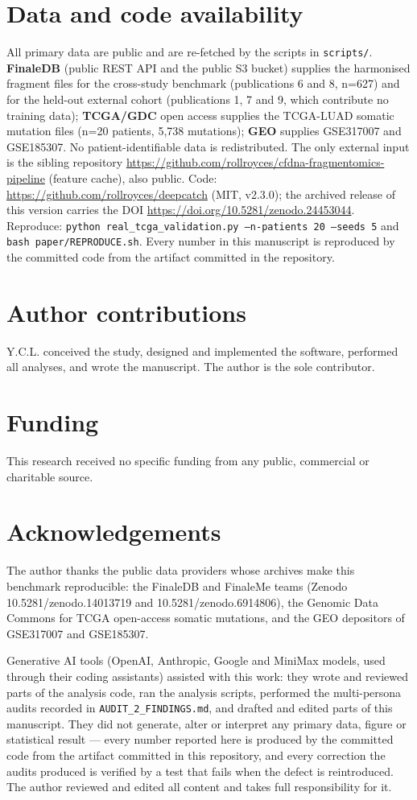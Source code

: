 \documentclass[11pt]{article}
\begin{document}
\section*{Data and code availability}
All primary data are public and are re-fetched by the scripts in
\texttt{scripts/}. \textbf{FinaleDB} (public REST API and the public S3
bucket) supplies the harmonised fragment files for the cross-study
benchmark (publications 6 and 8, n=627) and for the held-out external
cohort (publications 1, 7 and 9, which contribute no training data);
\textbf{TCGA/GDC} open access supplies the TCGA-LUAD somatic mutation
files (n=20 patients, 5,738 mutations); \textbf{GEO} supplies GSE317007
and GSE185307. No patient-identifiable data is redistributed. The only
external input is the sibling repository
\url{https://github.com/rollroyces/cfdna-fragmentomics-pipeline}
(feature cache), also public. Code: \url{https://github.com/rollroyces/deepcatch}
(MIT, v2.3.0); the archived release of this version carries the DOI
\url{https://doi.org/10.5281/zenodo.24453044}. Reproduce:
\texttt{python real\_tcga\_validation.py --n-patients 20 --seeds 5}
and \texttt{bash paper/REPRODUCE.sh}. Every number in this manuscript
is reproduced by the committed code from the artifact committed in the
repository.

\section*{Author contributions}
Y.C.L. conceived the study, designed and implemented the software,
performed all analyses, and wrote the manuscript. The author is the sole
contributor.

\section*{Funding}
This research received no specific funding from any public, commercial
or charitable source.

\section*{Acknowledgements}
The author thanks the public data providers whose archives make this
benchmark reproducible: the FinaleDB and FinaleMe teams (Zenodo
10.5281/zenodo.14013719 and 10.5281/zenodo.6914806), the Genomic Data
Commons for TCGA open-access somatic mutations, and the GEO depositors
of GSE317007 and GSE185307.

Generative AI tools (OpenAI, Anthropic, Google and MiniMax models, used
through their coding assistants) assisted with this work: they wrote and
reviewed parts of the analysis code, ran the analysis scripts, performed
the multi-persona audits recorded in \texttt{AUDIT\_2\_FINDINGS.md},
and drafted and edited parts of this manuscript. They did not generate,
alter or interpret any primary data, figure or statistical result ---
every number reported here is produced by the committed code from the
artifact committed in this repository, and every correction the audits
produced is verified by a test that fails when the defect is
reintroduced. The author reviewed and edited all content and takes full
responsibility for it.
\end{document}
